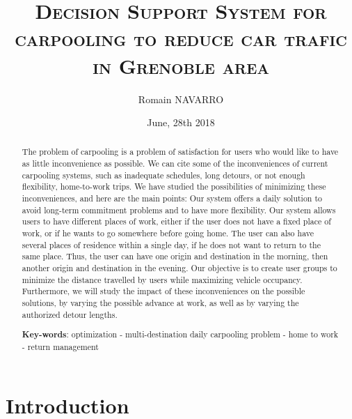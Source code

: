 \documentclass[12pt, a4paper,twoside]{memoir}
\title{\textsc{Decision Support System for carpooling to reduce car trafic in Grenoble area}}%
\author{Romain NAVARRO}
\date{June, 28th 2018}
\newcommand{\newpar}{\vskip 0.2in \noindent}
\begin{document}
	\frontmatter\begin{titlingpage}\maketitle\end{titlingpage}
	\begin{abstract}
		\noindent The problem of carpooling is a problem of satisfaction for users who would like to have as little inconvenience as possible. We can cite some of the inconveniences of current carpooling systems, such as inadequate schedules, long detours, or not enough flexibility, home-to-work trips.
		\newpar
		We have studied the possibilities of minimizing these inconveniences, and here are the main points:\newline 
		Our system offers a daily solution to avoid long-term commitment problems and to have more flexibility.\newline 
		Our system allows users to have different places of work, either if the user does not have a fixed place of work, or if he wants to go somewhere before going home. The user can also have several places of residence within a single day, if he does not want to return to the same place. Thus, the user can have one origin and destination in the morning, then another origin and destination in the evening.
		\newpar
		Our objective is to create user groups to minimize the distance travelled by users while maximizing vehicle occupancy. \newline
		Furthermore, we will study the impact of these inconveniences on the possible solutions, by varying the possible advance at work, as well as by varying the authorized detour lengths.
		\begin{center}
			{\bfseries Key-words}: optimization - multi-destination daily carpooling problem - home to work - return management
		\end{center}
	\end{abstract}

	\cleardoublepage
	\renewcommand{\contentsname}{Table of contents}
	\mainmatter
	\tableofcontents
	
	\cleardoublepage
	\chapter{Introduction}
	
\end{document}
